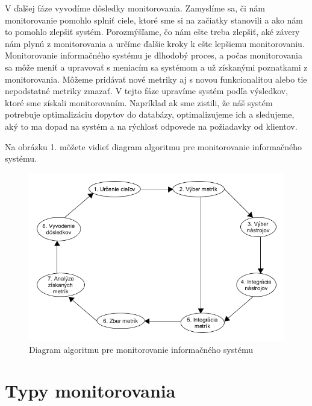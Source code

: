 \documentclass[a4paper, upjsfrontpage, thesismargins, thesislinespacing]{rnthesis}
\begin{document}
V ďalšej fáze vyvodíme dôsledky monitorovania.
Zamyslíme sa, či nám monitorovanie pomohlo splniť ciele, ktoré sme si na začiatky stanovili a ako nám to pomohlo zlepšiť systém.
Porozmýšľame, čo nám ešte treba zlepšiť, aké závery nám plynú z monitorovania a určíme ďalšie kroky k ešte lepšiemu monitorovaniu.
Monitorovanie informačného systému je dlhodobý proces, a počas monitorovania sa môže meniť a upravovať s meniacím sa systémom a už získanými poznatkami z monitorovania.
Môžeme pridávať nové metriky aj s novou funkcionalitou alebo tie nepodstatné metriky zmazať.
V tejto fáze upravíme systém podľa výsledkov, ktoré sme získali monitorovaním.
Napríklad ak sme zistili, že náš systém potrebuje optimalizáciu dopytov do databázy, optimalizujeme ich a sledujeme, aký to ma dopad na systém a na rýchlosť odpovede na požiadavky od klientov.

Na obrázku 1. môžete vidieť diagram algoritmu pre monitorovanie informačného systému.

\begin{figure}
\begin{center}
\includegraphics[scale=0.41]{ais_algorithm.png}
\caption{Diagram algoritmu pre monitorovanie informačného systému}
\end{center}
\end{figure}

\newpage

\chapter{Typy monitorovania}
\end{document}
